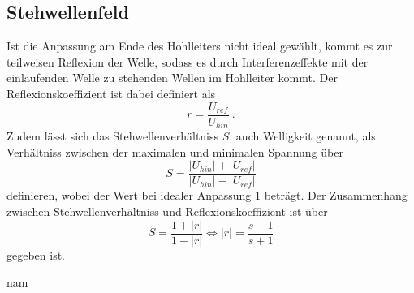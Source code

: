 \subsection{Stehwellenfeld}
Ist die Anpassung am Ende des Hohlleiters nicht ideal gewählt, kommt es zur teilweisen Reflexion
der Welle, sodass es durch Interferenzeffekte mit der einlaufenden Welle zu stehenden
Wellen im Hohlleiter kommt. Der Reflexionskoeffizient ist dabei definiert als
\begin{equation}
    r= \frac{U_{ref}}{U_{hin}} \:.
  \label{eqn:refl}
\end{equation}
Zudem lässt sich das Stehwellenverhältniss $S$, auch Welligkeit genannt, als Verhältniss
zwischen der maximalen und minimalen Spannung über
\begin{equation}
    S= \frac{\lvert U_{hin}\rvert + \lvert U_{ref}\rvert}{\lvert U_{hin}\rvert - \lvert U_{ref}\rvert}
  \label{eqn:SWV}
\end{equation}
definieren, wobei der Wert bei idealer Anpassung 1 beträgt. Der Zusammenhang zwischen Stehwellenverhältniss
und Reflexionskoeffizient ist über
\begin{equation}
    S= \frac{1 + \lvert r\rvert}{1 - \lvert r\rvert} \iff \lvert r\rvert = \frac{s-1}{s+1}
  \label{eqn:reflundSWV}
\end{equation}
gegeben ist.













nam

